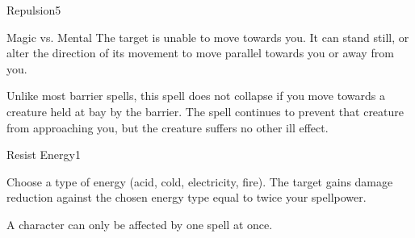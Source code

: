\begin{spellsection}{Repulsion}{5}
    \begin{spellheader}
    \end{spellheader}
    \begin{spellcontent}
        \begin{spelltargetinginfo}
        \end{spelltargetinginfo}
        \begin{spelleffects}
            \begin{spellattack}{Magic vs. Mental}
                \spellsuccess The target is unable to move towards you. It can stand still, or alter the direction of its movement to move parallel towards you or away from you.
            \end{spellattack}
            \spelldur \durshort \dismissable
        \end{spelleffects}
    \end{spellcontent}
    \begin{spellfooter}
        \spellnotes Unlike most barrier spells, this spell does not collapse if you move towards a creature held at bay by the barrier. The spell continues to prevent that creature from approaching you, but the creature suffers no other ill effect.
        \miscastexplode
    \end{spellfooter}
\end{spellsection}

\begin{spellsection}{Resist Energy}{1}
    \begin{spellheader}
    \end{spellheader}
    \begin{spellcontent}
        \begin{spelltargetinginfo}
        \end{spelltargetinginfo}
        \begin{spelleffects}
            \spellspecial Choose a type of energy (acid, cold, electricity, fire).
            \spelleffect The target gains damage reduction against the chosen energy type equal to twice your spellpower.
            \spelldur \durpersonallong
        \end{spelleffects}
    \end{spellcontent}
    \begin{spellfooter}
        \spellnotes A character can only be affected by one  spell at once.
        \miscastexplode
    \end{spellfooter}
\end{spellsection}


